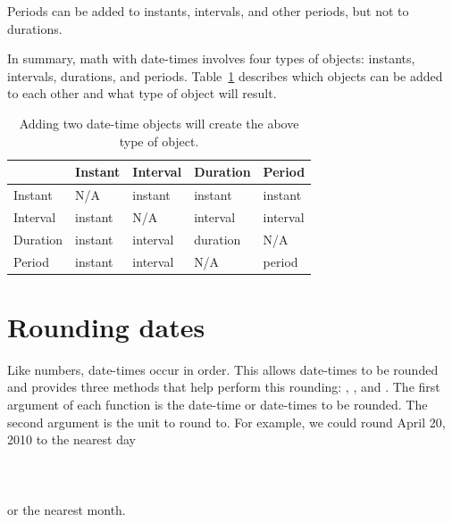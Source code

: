 \documentclass[article]{jss}
\begin{document}
Periods can be added to instants, intervals, and other periods, but not to durations.


In summary, math with date-times involves four types of objects: instants, intervals, durations, and periods. Table~\ref{tbl:date-math} describes which objects can be added to each other and what type of object will result.

\begin{table}
  \begin{center}
  \begin{tabular}{l|llll}
  & Instant & Interval & Duration & Period\\
  \hline
  Instant & N/A & instant & instant & instant\\
  Interval & instant & N/A & interval & interval\\
  Duration & instant & interval & duration & N/A\\
  Period & instant & interval & N/A & period\\
  \hline
    
  \end{tabular}
  \end{center}
  \caption{Adding two date-time objects will create the above type of object.}
  \label{tbl:date-math}
\end{table}

\section{Rounding dates}
Like numbers, date-times occur in order. This allows date-times to be rounded and  provides three methods that help perform this rounding: , , and . The first argument of each function is the date-time or date-times to be rounded. The second argument is the unit to round to. For example, we could round April 20, 2010 to the nearest day\\

\\
\\
\\

or the nearest month.\\

\\
\\
\end{document}
